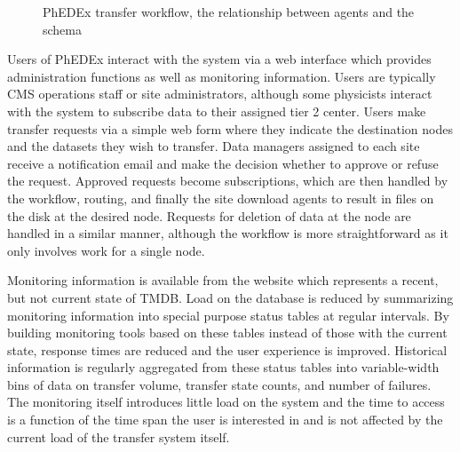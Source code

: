 \documentclass{PoS}
\begin{document}
\begin{figure}[htp] 
\centering
\setlength\fboxsep{0pt} 
\setlength\fboxrule{0.5pt} 
\caption{PhEDEx transfer workflow, the relationship between agents and the schema}
\label{fig:workflow}
\end{figure}

Users of PhEDEx interact with the system via a web interface which
provides administration functions as well as monitoring information.
Users are typically CMS operations staff or site administrators,
although some physicists interact with the system to subscribe data to
their assigned tier 2 center.  Users make transfer requests via a
simple web form where they indicate the destination nodes and the
datasets they wish to transfer.  Data managers assigned to each site
receive a notification email and make the decision whether to approve
or refuse the request.  Approved requests become subscriptions, which
are then handled by the workflow, routing, and finally the site
download agents to result in files on the disk at the desired node.
Requests for deletion of data at the node are handled in a similar
manner, although the workflow is more straightforward as it only
involves work for a single node.

Monitoring information is available from the website which represents
a recent, but not current state of TMDB.  Load on the database is
reduced by summarizing monitoring information into special purpose
status tables at regular intervals.  By building monitoring tools
based on these tables instead of those with the current state,
response times are reduced and the user experience is improved.
Historical information is regularly aggregated from these status
tables into variable-width bins of data on transfer volume, transfer
state counts, and number of failures.  The monitoring itself
introduces little load on the system and the time to access is a
function of the time span the user is interested in and is not
affected by the current load of the transfer system itself.
\end{document}
